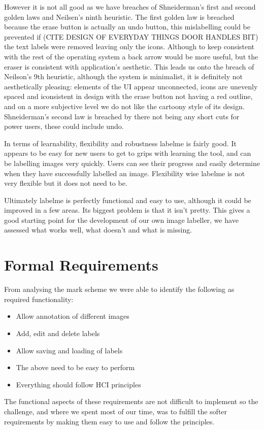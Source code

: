\documentclass[a4paper,11pt,oneside]{article}
\begin{document}
However it is not all good as we have breaches of Shneiderman's first and
second golden laws and Neilsen's ninth heuristic.  The first golden law is
breached because the erase button is actually an undo button, this mislabelling
could be prevented if (CITE DESIGN OF EVERYDAY THINGS DOOR HANDLES BIT) the text
labels were removed leaving only the icons.  Although to keep consistent with
the rest of the operating system a back arrow would be more useful, but the
eraser is consistent with application's aesthetic.  This leads us onto the
breach of Neilson's 9th heuristic, although the system is minimalist, it is
definitely not aesthetically pleasing: elements of the UI appear unconnected,
icons are unevenly spaced and iconsistent in design with the erase button not
having a red outline, and on a more subjective level we do not like the cartoony
style of its design.  Shneiderman's second law is breached by there not being
any short cuts for power users, these could include undo.

In terms of learnability, flexibility and robustness labelme is fairly good. 
It appears to be easy for new users to get to grips with learning the tool, and
can be labelling images very quickly.  Users can see their progress and easily
determine when they have successfully labelled an image.  Flexibility wise
labelme is not very flexible but it does not need to be.

Ultimately labelme is perfectly functional and easy to use, although it could be
improved in a few areas.  Its biggest problem is that it isn't pretty.  This
gives a good starting point for the development of our own image labeller, we
have assessed what works well, what doesn't and what is missing.

\section{Formal Requirements}

From analysing the mark scheme we were able to identify the following as
required functionality:
\begin{itemize}
\item Allow annotation of different images
\item Add, edit and delete labels
\item Allow saving and loading of labels
\item The above need to be easy to perform
\item Everything should follow HCI principles
\end{itemize}
The functional aspects of these requirements are not difficult to implement so
the challenge, and where we spent most of our time, was to fulfill the softer
requirements by making them easy to use and follow the principles.
\end{document}
